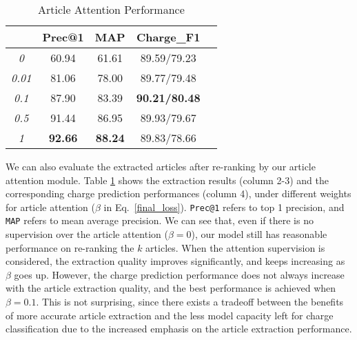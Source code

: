 \begin{table}
\centering
\normalsize{
\begin{tabular}{|c|c|c|c|c|}
\hline
\bm{$\beta$}							& \textbf{Prec@1} 		& \textbf{MAP} 			& \textbf{Charge\_F1} \\
\hline
\textit{0} 								& 60.94								& 61.61 						& 89.59/79.23 	\\
\hline
\textit{0.01} 						& 81.06								& 78.00							& 89.77/79.48 	\\
\hline
\textit{0.1} 							& 87.90								& 83.39							& \textbf{90.21/80.48} 	\\
\hline
\textit{0.5} 							& 91.44								& 86.95							& 89.93/79.67 	\\
\hline
\textit{1} 								& \textbf{92.66}			& \textbf{88.24}		& 89.83/78.66 	\\
\hline
\end{tabular}
}
\caption{Article Attention Performance}
\label{tab_article_att}
\end{table}


We can also evaluate the extracted articles after re-ranking by our article attention module.
Table \ref{tab_article_att} shows the extraction results  (column 2-3) and the corresponding charge prediction performances (column 4), under different weights for article attention ($\beta$ in Eq.~\ref{final_loss}). \texttt{Prec@1} refers to top 1 precision, and \texttt{MAP} refers to mean average precision.
%
We can see that, even if there is no supervision over the article attention ($\beta=0$), our model still has reasonable performance on re-ranking the $k$ articles. When the attention supervision is considered, the extraction quality improves significantly, and keeps increasing as $\beta$ goes up.
However, the charge prediction performance does not always increase with the article extraction quality, and the best performance is achieved when $\beta=0.1$. This is not surprising, since  there exists a tradeoff between the benefits of more accurate article extraction and the less model capacity left for charge classification due to the increased emphasis on the article extraction performance.

